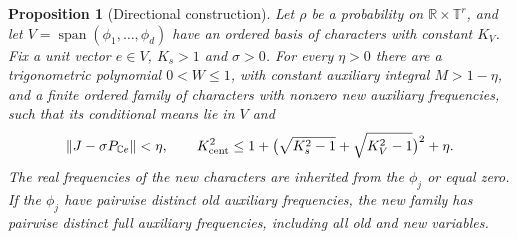 \documentclass[reqno,a4paper,12pt]{amsart}
\newtheorem{proposition}[theorem]{Proposition}
\newcommand{\R}{\mathbb R}
\newcommand{\C}{\mathbb C}
\newcommand{\T}{\mathbb T}
\newcommand{\spn}{\operatorname{span}}
\begin{document}
\begin{proposition}[Directional construction]\label{selective}
Let $\rho$ be a probability on $\R\times\T^r$, and let
$V=\spn(\phi_1,\ldots,\phi_d)$ have an ordered basis of characters
with constant $K_V$. Fix a unit vector $e\in V$, $K_s>1$ and $\sigma>0$.
For every $\eta>0$ there are a trigonometric polynomial $0<W\le1$,
with constant auxiliary integral $M>1-\eta$, and a finite ordered family
of characters with nonzero new auxiliary frequencies, such that its
conditional means lie in $V$ and
\[
 \|J-\sigma P_{\C e}\|<\eta,\qquad
 K_{\rm cent}^2\le
 1+\bigl(\sqrt{K_s^2-1}+\sqrt{K_V^2-1}\bigr)^2+\eta.
\]
The real frequencies of the new characters are inherited from the
$\phi_j$ or equal zero. If the $\phi_j$ have pairwise distinct old
auxiliary frequencies, the new family has pairwise distinct full
auxiliary frequencies, including all old and new variables.
\end{proposition}
\end{document}
